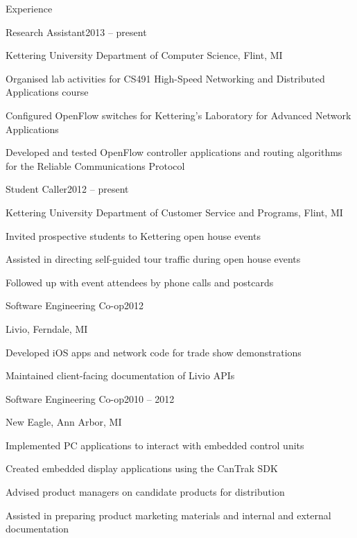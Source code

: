 \documentclass[letterpaper,12pt,oneside,compact]{article}
\begin{document}
\begin{heading}{Experience}
\begin{resitem}{Research Assistant\hfill 2013 -- present}
\item Kettering University Department of Computer Science, Flint, MI
\item Organised lab activities for CS491 High-Speed Networking and 
      Distributed Applications course
\item Configured OpenFlow switches for Kettering's Laboratory for Advanced 
      Network Applications
\item Developed and tested OpenFlow controller applications and routing algorithms 
      for the Reliable Communications Protocol
\end{resitem}

\begin{resitem}{Student Caller\hfill 2012 -- present}
\item Kettering University Department of Customer Service and Programs, Flint, MI
\item Invited prospective students to Kettering open house events
\item Assisted in directing self-guided tour traffic during open house events
\item Followed up with event attendees by phone calls and postcards
\end{resitem}

\begin{resitem}{Software Engineering Co-op\hfill 2012}
\item Livio, Ferndale, MI
\item Developed iOS apps and network code for trade show demonstrations
\item Maintained client-facing documentation of Livio APIs
\end{resitem}

\begin{resitem}{Software Engineering Co-op\hfill 2010 -- 2012}
\item New Eagle, Ann Arbor, MI
\item Implemented PC applications to interact with embedded control units
\item Created embedded display applications using the CanTrak SDK
\item Advised product managers on candidate products for distribution
\item Assisted in preparing product marketing materials and internal and 
      external documentation
\end{resitem}
\end{heading}
\end{document}
